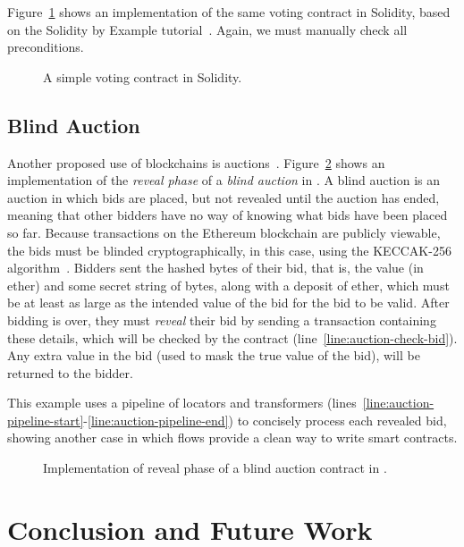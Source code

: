 \documentclass[nonacm, dvipsnames, sigconf]{acmart}
\begin{document}
Figure~\ref{fig:voting-impl-sol} shows an implementation of the same voting contract in Solidity, based on the Solidity by Example tutorial~\cite{solidityByExample}.
Again, we must manually check all preconditions.
\begin{figure}
    \centering
    
    \caption{A simple voting contract in Solidity.}
    \label{fig:voting-impl-sol}
\end{figure}

\subsection{Blind Auction}\label{sec:blind-auction-impl}
Another proposed use of blockchains is auctions~\cite{Elsden18:Making}.
Figure~\ref{fig:blind-auction-impl-flow} shows an implementation of the \emph{reveal phase} of a \emph{blind auction} in \langName.
A blind auction is an auction in which bids are placed, but not revealed until the auction has ended, meaning that other bidders have no way of knowing what bids have been placed so far.
Because transactions on the Ethereum blockchain are publicly viewable, the bids must be blinded cryptographically, in this case, using the KECCAK-256 algorithm~\cite{bertoni2013keccak}.
Bidders sent the hashed bytes of their bid, that is, the value (in ether) and some secret string of bytes, along with a deposit of ether, which must be at least as large as the intended value of the bid for the bid to be valid.
After bidding is over, they must \emph{reveal} their bid by sending a transaction containing these details, which will be checked by the  contract (line~\ref{line:auction-check-bid}).
Any extra value in the bid (used to mask the true value of the bid), will be returned to the bidder.

This example uses a pipeline of locators and transformers (lines~\ref{line:auction-pipeline-start}-\ref{line:auction-pipeline-end}) to concisely process each revealed bid, showing another case in which flows provide a clean way to write smart contracts.

\begin{figure}
    \centering
    
    \caption{Implementation of reveal phase of a blind auction contract in \langName.}
    \label{fig:blind-auction-impl-flow}
\end{figure}

\section{Conclusion and Future Work}
\end{document}
